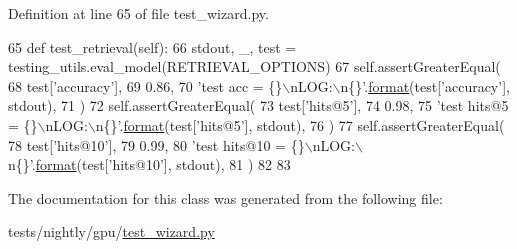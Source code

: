 Definition at line 65 of file test\+\_\+wizard.\+py.


\begin{DoxyCode}
65     \textcolor{keyword}{def }test\_retrieval(self):
66         stdout, \_, test = testing\_utils.eval\_model(RETRIEVAL\_OPTIONS)
67         self.assertGreaterEqual(
68             test[\textcolor{stringliteral}{'accuracy'}],
69             0.86,
70             \textcolor{stringliteral}{'test acc = \{\}\(\backslash\)nLOG:\(\backslash\)n\{\}'}.\hyperlink{namespaceparlai_1_1chat__service_1_1services_1_1messenger_1_1shared__utils_a32e2e2022b824fbaf80c747160b52a76}{format}(test[\textcolor{stringliteral}{'accuracy'}], stdout),
71         )
72         self.assertGreaterEqual(
73             test[\textcolor{stringliteral}{'hits@5'}],
74             0.98,
75             \textcolor{stringliteral}{'test hits@5 = \{\}\(\backslash\)nLOG:\(\backslash\)n\{\}'}.\hyperlink{namespaceparlai_1_1chat__service_1_1services_1_1messenger_1_1shared__utils_a32e2e2022b824fbaf80c747160b52a76}{format}(test[\textcolor{stringliteral}{'hits@5'}], stdout),
76         )
77         self.assertGreaterEqual(
78             test[\textcolor{stringliteral}{'hits@10'}],
79             0.99,
80             \textcolor{stringliteral}{'test hits@10 = \{\}\(\backslash\)nLOG:\(\backslash\)n\{\}'}.\hyperlink{namespaceparlai_1_1chat__service_1_1services_1_1messenger_1_1shared__utils_a32e2e2022b824fbaf80c747160b52a76}{format}(test[\textcolor{stringliteral}{'hits@10'}], stdout),
81         )
82 
83 
\end{DoxyCode}


The documentation for this class was generated from the following file\+:\begin{DoxyCompactItemize}
\item 
tests/nightly/gpu/\hyperlink{test__wizard_8py}{test\+\_\+wizard.\+py}\end{DoxyCompactItemize}
